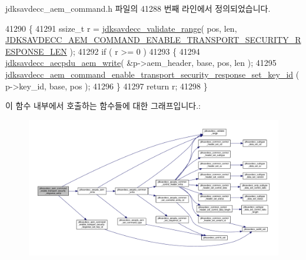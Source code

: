 jdksavdecc\+\_\+aem\+\_\+command.\+h 파일의 41288 번째 라인에서 정의되었습니다.


\begin{DoxyCode}
41290 \{
41291     ssize\_t r = \hyperlink{group__util_ga9c02bdfe76c69163647c3196db7a73a1}{jdksavdecc\_validate\_range}( pos, len, 
      \hyperlink{group__command__enable__transport__security__response_ga223c1e5ef8ff2bc723fad4c3a535cf76}{JDKSAVDECC\_AEM\_COMMAND\_ENABLE\_TRANSPORT\_SECURITY\_RESPONSE\_LEN}
       );
41292     \textcolor{keywordflow}{if} ( r >= 0 )
41293     \{
41294         \hyperlink{group__aecpdu__aem_gad658e55771cce77cecf7aae91e1dcbc5}{jdksavdecc\_aecpdu\_aem\_write}( &p->aem\_header, base, pos, len );
41295         \hyperlink{group__command__enable__transport__security__response_ga648fc2bb72777b59ce0004711651a533}{jdksavdecc\_aem\_command\_enable\_transport\_security\_response\_set\_key\_id}
      ( p->key\_id, base, pos );
41296     \}
41297     \textcolor{keywordflow}{return} r;
41298 \}
\end{DoxyCode}


이 함수 내부에서 호출하는 함수들에 대한 그래프입니다.\+:
\nopagebreak
\begin{figure}[H]
\begin{center}
\leavevmode
\includegraphics[width=350pt]{group__command__enable__transport__security__response_gab502d1824ddc62d76b915c7f993ad28b_cgraph}
\end{center}
\end{figure}


